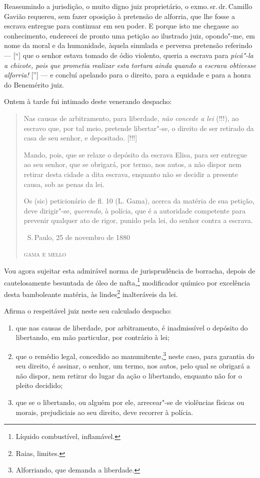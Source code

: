Reassumindo a jurisdição, o muito digno juiz proprietário, o exmo.\,sr.\,dr.\,Camillo Gavião requereu, sem fazer oposição à pretensão de alforria,
que lhe fosse a escrava entregue para continuar em seu poder. E porque
isto me chegasse ao conhecimento, enderecei de pronto uma petição ao
ilustrado juiz, opondo"-me, em nome da moral e da humanidade, àquela
simulada e perversa pretensão referindo --- {[}``{]} que o senhor estava
tomado de ódio violento, queria a escrava para \emph{picá"-la a chicote,
pois que prometia realizar esta tortura ainda quando a escrava obtivesse
alforria!} {[}''{]} --- e concluí apelando para o direito, para a equidade
e para a honra do Benemérito juiz.

Ontem à tarde fui intimado deste venerando despacho:

\begin{quote}
Nas causas de arbitramento, para liberdade, \emph{não concede a lei}
(!!!), ao escravo que, por tal meio, pretende libertar"-se, o direito de
ser retirado da casa de seu senhor, e depositado. {[}!!!{]}

Mando, pois, que se relaxe o depósito da escrava Elisa, para ser
entregue ao seu senhor, que se obrigará, por termo, nos autos, a não
dispor nem retirar desta cidade a dita escrava, enquanto não se decidir
a presente causa, sob as penas da lei.

Os (sic) peticionário de fl. 10 (L. Gama), acerca da matéria de sua
petição, deve dirigir"-se, \emph{querendo}, à polícia, que é a autoridade
competente para prevenir qualquer ato de rigor, punido pela lei, do
senhor contra a escrava.

\medskip

\hfill\ S.\,Paulo, 25 de novembro de 1880\smallskip

\hfill\textsc{gama e mello}
\end{quote}

\asterisc

Vou agora sujeitar esta admirável norma de jurisprudência de borracha,
depois de cautelosamente besuntada de óleo de nafta,\footnote{Líquido
  combustível, inflamável.} modificador químico por excelência desta
bamboleante matéria, às lindes\footnote{Raias, limites.} inalteráveis
da lei.

Afirma o respeitável juiz neste seu calculado despacho:

\begin{enumerate}[label=\arabic*º]
\item que nas causas de liberdade, por arbitramento, é inadmissível
o depósito do libertando, em mão particular, por contrário à lei;

\item que o remédio legal, concedido ao manumitente,\footnote{
  Alforriando, que demanda a liberdade.} neste caso, para garantia do
seu direito, é assinar, o senhor, um termo, nos autos, pelo qual se
obrigará a não dispor, nem retirar do lugar da ação o libertando,
enquanto não for o pleito decidido;

\item que se o libertando, ou alguém por ele, arrecear"-se de
violências físicas ou morais, prejudiciais ao seu direito, deve recorrer
à polícia.
\end{enumerate}

